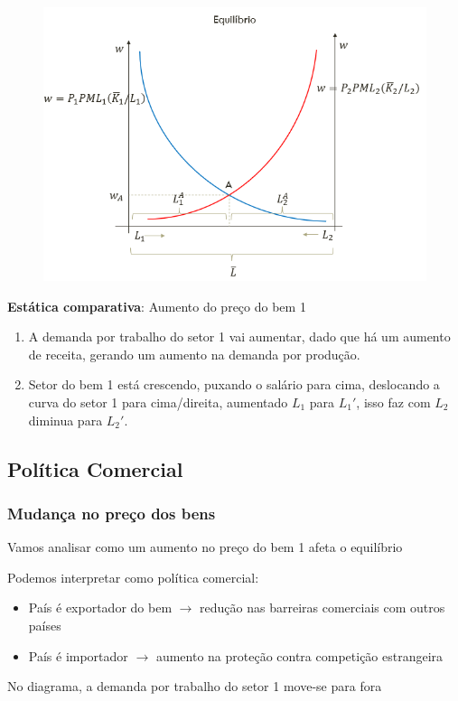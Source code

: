 \documentclass[a4paper,12pt]{article}[abntex2]
\begin{document}
\begin{figure}[H]
    \centering
    \includegraphics[width=0.7\linewidth]{Imagens/a14i3.png}
\end{figure}

\textbf{Estática comparativa}: Aumento do preço do bem 1\begin{enumerate}
    \item A demanda por trabalho do setor 1 vai aumentar, dado que há um aumento de receita, gerando um aumento na demanda por produção. 
    \item Setor do bem 1 está crescendo, puxando o salário para cima, deslocando a curva do setor 1 para cima/direita, aumentado \(L_1\) para \(L_1'\), isso faz com \(L_2\) diminua para \(L_2'\).
\end{enumerate}

\subsection{\textbf{Política Comercial}}
\subsubsection{\textbf{Mudança no preço dos bens}}
Vamos analisar como um aumento no preço do bem 1 afeta o equilíbrio

Podemos interpretar como política comercial:
\begin{itemize}
  \item País é exportador do bem $\rightarrow$ redução nas barreiras comerciais com outros países
  \item País é importador $\rightarrow$ aumento na proteção contra competição estrangeira
\end{itemize}

No diagrama, a demanda por trabalho do setor 1 move-se para fora
\end{document}
